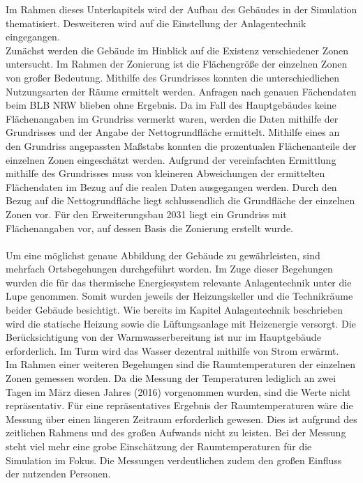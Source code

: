 Im Rahmen dieses Unterkapitels wird der Aufbau des Gebäudes in der Simulation thematisiert. Desweiteren wird auf die Einstellung der Anlagentechnik eingegangen. \\
Zunächst werden die Gebäude im Hinblick auf die Existenz verschiedener Zonen untersucht. Im Rahmen der Zonierung ist die Flächengröße der einzelnen Zonen von großer Bedeutung. Mithilfe des Grundrisses konnten die unterschiedlichen Nutzungsarten der Räume ermittelt werden. Anfragen nach genauen Fächendaten beim BLB NRW blieben ohne Ergebnis. Da im Fall des Hauptgebäudes keine Flächenangaben im Grundriss vermerkt waren, werden die Daten mithilfe der Grundrisses und der Angabe der Nettogrundfläche ermittelt. Mithilfe eines an den Grundriss angepassten Maßstabs konnten die prozentualen Flächenanteile der einzelnen Zonen eingeschätzt werden. Aufgrund der vereinfachten Ermittlung mithilfe des Grundrisses muss von kleineren Abweichungen der ermittelten Flächendaten im Bezug auf die realen Daten ausgegangen werden. Durch den Bezug auf die Nettogrundfläche liegt schlussendlich die Grundfläche der einzelnen Zonen vor. Für den Erweiterungsbau 2031 liegt ein Grundriss mit Flächenangaben vor, auf dessen Basis die Zonierung erstellt wurde.\\
\\
Um eine möglichst genaue Abbildung der Gebäude zu gewährleisten, sind mehrfach Ortsbegehungen durchgeführt worden. Im Zuge dieser Begehungen wurden die für das thermische Energiesystem relevante Anlagentechnik unter die Lupe genommen. Somit wurden jeweils der Heizungskeller und die Technikräume beider Gebäude besichtigt. Wie bereits im Kapitel Anlagentechnik beschrieben wird die statische Heizung sowie die Lüftungsanlage mit Heizenergie versorgt. Die Berücksichtigung von der Warmwasserbereitung ist nur im Hauptgebäude erforderlich. Im Turm wird das Wasser dezentral mithilfe von Strom erwärmt.\\
Im Rahmen einer weiteren Begehungen sind die Raumtemperaturen der einzelnen Zonen gemessen worden. Da die Messung der Temperaturen lediglich an zwei Tagen im März diesen Jahres (2016) vorgenommen wurden, sind die Werte nicht repräsentativ. Für eine repräsentatives Ergebnis der Raumtemperaturen wäre die Messung über einen längeren Zeitraum erforderlich gewesen. Dies ist aufgrund des zeitlichen Rahmens und des großen Aufwands nicht zu leisten. Bei der Messung steht viel mehr eine grobe Einschätzung der Raumtemperaturen für die Simulation im Fokus. Die Messungen verdeutlichen zudem den großen Einfluss der nutzenden Personen. \\
